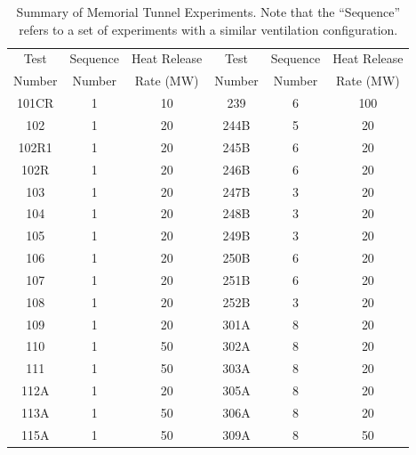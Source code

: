 \begin{table}[p]
\caption[Summary of Memorial Tunnel Experiments]{Summary of Memorial Tunnel Experiments. Note that the ``Sequence'' refers to a set of experiments with a similar ventilation configuration. }
\begin{center}
\begin{tabular}{|c|c|c||c|c|c|}
\hline
Test    & Sequence & Heat Release     & Test    & Sequence & Heat Release  \\
Number  & Number   & Rate (MW)        & Number  & Number   & Rate (MW)     \\ \hline \hline
101CR   &   1      &  10              & 239     &   6      & 100           \\ \hline
102     &   1      &  20              & 244B    &   5      &  20           \\ \hline
102R1   &   1      &  20              & 245B    &   6      &  20           \\ \hline
102R    &   1      &  20              & 246B    &   6      &  20           \\ \hline
103     &   1      &  20              & 247B    &   3      &  20           \\ \hline
104     &   1      &  20              & 248B    &   3      &  20           \\ \hline
105     &   1      &  20              & 249B    &   3      &  20           \\ \hline
106     &   1      &  20              & 250B    &   6      &  20           \\ \hline
107     &   1      &  20              & 251B    &   6      &  20           \\ \hline
108     &   1      &  20              & 252B    &   3      &  20           \\ \hline
109     &   1      &  20              & 301A    &   8      &  20           \\ \hline
110     &   1      &  50              & 302A    &   8      &  20           \\ \hline
111     &   1      &  50              & 303A    &   8      &  20           \\ \hline
112A    &   1      &  20              & 305A    &   8      &  20           \\ \hline
113A    &   1      &  50              & 306A    &   8      &  20           \\ \hline
115A    &   1      &  50              & 309A    &   8      &  50           \\ \hline

\end{tabular}
\end{center}
\end{table}
